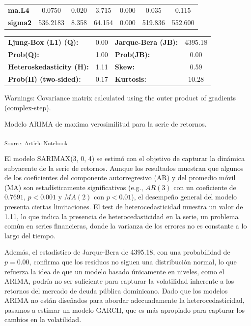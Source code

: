 \documentclass[
  number,
  preprint,
  3p,
  onecolumn]{elsarticle}
\begin{document}
\begin{center}
\begin{tabular}{lcccccc}
\textbf{ma.L4}     &       0.0750  &        0.020     &     3.715  &         0.000        &        0.035    &        0.115     \\
\textbf{sigma2}    &     536.2183  &        8.358     &    64.154  &         0.000        &      519.836    &      552.600     \\
\bottomrule
\end{tabular}
\begin{tabular}{lclc}
\textbf{Ljung-Box (L1) (Q):}     & 0.00 & \textbf{  Jarque-Bera (JB):  } & 4395.18  \\
\textbf{Prob(Q):}                & 1.00 & \textbf{  Prob(JB):          } &   0.00   \\
\textbf{Heteroskedasticity (H):} & 1.11 & \textbf{  Skew:              } &   0.59   \\
\textbf{Prob(H) (two-sided):}    & 0.17 & \textbf{  Kurtosis:          } &  10.28   \\
\bottomrule
\end{tabular}
\end{center}

Warnings: \newline
 [1] Covariance matrix calculated using the outer product of gradients (complex-step).

Modelo ARIMA de maxima verosimilitud para la serie de retornos.

\textsubscript{Source:
\href{https://iancont.github.io/fixed_income_garch/index.qmd.html}{Article
Notebook}}

El modelo SARIMAX(3, 0, 4) se estimó con el objetivo de capturar la
dinámica subyacente de la serie de retornos. Aunque los resultados
muestran que algunos de los coeficientes del componente autorregresivo
(AR) y del promedio móvil (MA) son estadísticamente significativos
(e.g., \(AR(3)\) con un coeficiente de \(0.7691\), \(p < 0.001\) y
\(MA(2)\) con \(p < 0.01\)), el desempeño general del modelo presenta
ciertas limitaciones. El test de heterocedasticidad muestra un valor de
1.11, lo que indica la presencia de heterocedasticidad en la serie, un
problema común en series financieras, donde la varianza de los errores
no es constante a lo largo del tiempo.

Además, el estadístico de Jarque-Bera de 4395.18, con una probabilidad
de \(p = 0.00\), confirma que los residuos no siguen una distribución
normal, lo que refuerza la idea de que un modelo basado únicamente en
niveles, como el ARIMA, podría no ser suficiente para capturar la
volatilidad inherente a los retornos del mercado de deuda pública
dominicano. Dado que los modelos ARIMA no están diseñados para abordar
adecuadamente la heterocedasticidad, pasamos a estimar un modelo GARCH,
que es más apropiado para capturar los cambios en la volatilidad.
\end{document}
